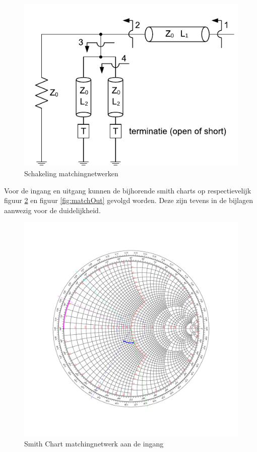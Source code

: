   \begin{figure}[!hb]
    \centering
    \includegraphics[keepaspectratio=true]{fig/matching.pdf}
    \caption{Schakeling matchingnetwerken}
    \label{fig:schakelingMatch}
  \end{figure}


  Voor de ingang en uitgang kunnen de bijhorende smith charts op respectievelijk
  figuur \ref{fig:matchIn} en figuur \ref{fig:matchOut} gevolgd worden. Deze zijn
  tevens in de bijlagen aanwezig voor de duidelijkheid.

  \begin{figure}
    \centering
    \includegraphics[width=\textwidth,keepaspectratio=true]{fig/matchSource.pdf}
    \caption{Smith Chart matchingnetwerk aan de ingang}
    \label{fig:matchIn}
  \end{figure}


